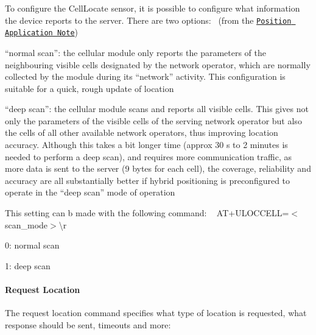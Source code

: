 To configure the Cell\+Locate sensor, it is possible to configure what information the device reports to the server. There are two options\+:~\newline
 (from the \href{https://www.u-blox.com/sites/default/files/GNSS-Implementation_AppNote_%28UBX-13001849%29.pdf}{\tt Position Application Note})
\begin{DoxyItemize}
\item “normal scan”\+: the cellular module only reports the parameters of the neighbouring visible cells designated by the network operator, which are normally collected by the module during its “network” activity. This configuration is suitable for a quick, rough update of location
\item “deep scan”\+: the cellular module scans and reports all visible cells. This gives not only the parameters of the visible cells of the serving network operator but also the cells of all other available network operators, thus improving location accuracy. Although this takes a bit longer time (approx 30 s to 2 minutes is needed to perform a deep scan), and requires more communication traffic, as more data is sent to the server (9 bytes for each cell), the coverage, reliability and accuracy are all substantially better if hybrid positioning is preconfigured to operate in the “deep scan” mode of operation
\end{DoxyItemize}

This setting can b made with the following command\+: ~\newline
 {\ttfamily A\+T+\+U\+L\+O\+C\+C\+E\+LL=$<$scan\+\_\+mode$>$\textbackslash{}r} ~\newline

\begin{DoxyItemize}
\item 0\+: normal scan~\newline

\item 1\+: deep scan~\newline

\end{DoxyItemize}

\paragraph*{Request Location}

The request location command specifies what type of location is requested, what response should be sent, timeouts and more\+: ~\newline


